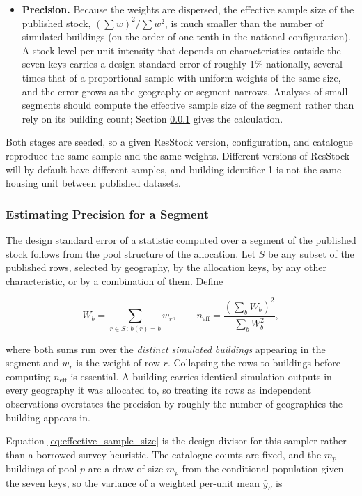 \begin{itemize}
    \item \textbf{Precision.} Because the weights are dispersed, the effective sample size of the published stock, $(\sum w)^2 / \sum w^2$, is much smaller than the number of simulated buildings (on the order of one tenth in the national configuration). A stock-level per-unit intensity that depends on characteristics outside the seven keys carries a design standard error of roughly 1\% nationally, several times that of a proportional sample with uniform weights of the same size, and the error grows as the geography or segment narrows. Analyses of small segments should compute the effective sample size of the segment rather than rely on its building count; Section \ref{sec:segment_precision} gives the calculation.
\end{itemize}

Both stages are seeded, so a given ResStock version, configuration, and catalogue reproduce the same sample and the same weights. Different versions of ResStock will by default have different samples, and building identifier 1 is not the same housing unit between published datasets.

\subsubsection{Estimating Precision for a Segment}\label{sec:segment_precision}
The design standard error of a statistic computed over a segment of the published stock follows from the pool structure of the allocation. Let $S$ be any subset of the published rows, selected by geography, by the allocation keys, by any other characteristic, or by a combination of them. Define

\begin{equation}\label{eq:effective_sample_size}
W_b = \sum_{r \in S \,:\, b(r) = b} w_r, \qquad n_{\mathrm{eff}} = \frac{\left(\sum_b W_b\right)^2}{\sum_b W_b^2},
\end{equation}

where both sums run over the \textit{distinct simulated buildings} appearing in the segment and $w_r$ is the weight of row $r$. Collapsing the rows to buildings before computing $n_{\mathrm{eff}}$ is essential. A building carries identical simulation outputs in every geography it was allocated to, so treating its rows as independent observations overstates the precision by roughly the number of geographies the building appears in.

Equation \ref{eq:effective_sample_size} is the design divisor for this sampler rather than a borrowed survey heuristic. The catalogue counts are fixed, and the $m_p$ buildings of pool $p$ are a draw of size $m_p$ from the conditional population given the seven keys, so the variance of a weighted per-unit mean $\hat{y}_S$ is

